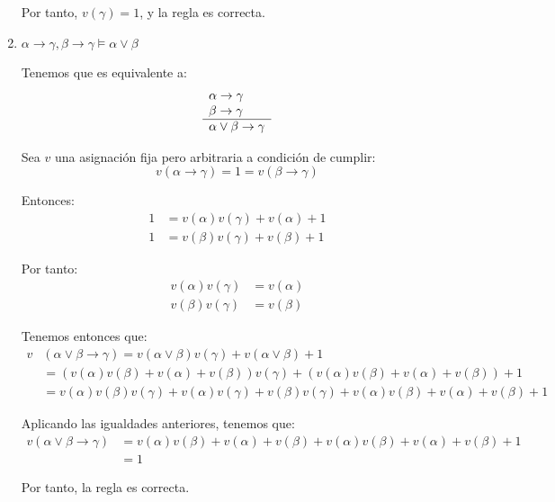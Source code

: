 \begin{ejercicio*}
\begin{enumerate}
    Por tanto, $v(\gamma)=1$, y la regla es correcta.

\item $\alpha\rightarrow \gamma, \beta\rightarrow \gamma \vDash \alpha\lor\beta$

Tenemos que es equivalente a:
\begin{equation*}
    \begin{array}{l}
        \alpha\rightarrow\gamma\\
        \beta\rightarrow\gamma\\ \hline
        \multicolumn{1}{c}{\alpha\lor\beta \rightarrow\gamma}        
    \end{array}
\end{equation*}

Sea $v$ una asignación fija pero arbitraria a condición de cumplir:
\begin{equation*}
    v(\alpha\rightarrow\gamma)=1=v(\beta\rightarrow\gamma)
\end{equation*}

Entonces:
\begin{align*}
    1 &= v(\alpha)v(\gamma)+v(\alpha)+1\\
    1 &= v(\beta)v(\gamma)+v(\beta)+1
\end{align*}

Por tanto:
\begin{align*}
    v(\alpha)v(\gamma) &= v(\alpha) \\
    v(\beta)v(\gamma) &= v(\beta)
\end{align*}

Tenemos entonces que:
\begin{align*}
    v &(\alpha\lor\beta\rightarrow\gamma)
    = v(\alpha\lor\beta)v(\gamma)+v(\alpha\lor\beta)+1\\
    &= (v(\alpha)v(\beta)+v(\alpha)+v(\beta))v(\gamma) + (v(\alpha)v(\beta)+v(\alpha)+v(\beta))+1\\
    &= v(\alpha)v(\beta)v(\gamma)+v(\alpha)v(\gamma)+v(\beta)v(\gamma) + v(\alpha)v(\beta)+v(\alpha)+v(\beta)+1
\end{align*}

Aplicando las igualdades anteriores, tenemos que:
\begin{align*}
    v (\alpha\lor\beta\rightarrow\gamma)
    &= v(\alpha)v(\beta)+v(\alpha)+v(\beta) + v(\alpha)v(\beta)+v(\alpha)+v(\beta)+1 \\
    &= 1
\end{align*}

Por tanto, la regla es correcta.


\end{enumerate}
\end{ejercicio*}
